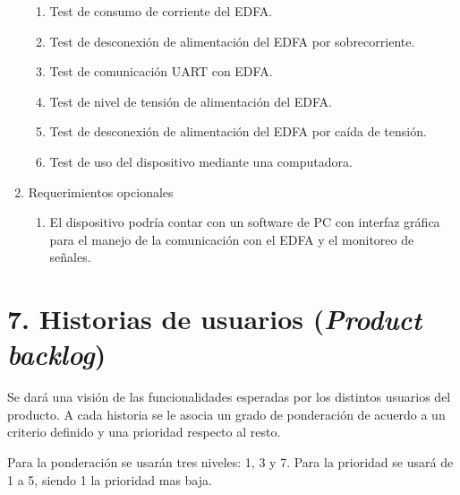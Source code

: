 \documentclass[
11pt, %
codirector, %
]{charter}
\begin{document}
\begin{enumerate}
		\begin{enumerate}
			\item Test de consumo de corriente del EDFA.
			\item Test de desconexión de alimentación del EDFA por sobrecorriente.
			\item Test de comunicación UART con EDFA.
			\item Test de nivel de tensión de alimentación del EDFA.
			\item Test de desconexión de alimentación del EDFA por caída de tensión.
			\item Test de uso del dispositivo mediante una computadora.
		\end{enumerate}
	\item Requerimientos opcionales
		\begin{enumerate}
			\item El dispositivo podría contar con un software de PC con interfaz gráfica para el manejo de la comunicación con el EDFA y el monitoreo de señales.
		\end{enumerate}
\end{enumerate}


\section{7. Historias de usuarios (\textit{Product backlog})}
\label{sec:backlog}

Se dará una visión de las funcionalidades esperadas por los distintos usuarios del producto. A cada
historia se le asocia un grado de ponderación de acuerdo a un criterio definido y una prioridad
respecto al resto.


Para la ponderación se usarán tres niveles: 1, 3 y 7. 
Para la prioridad se usará de 1 a 5, siendo 1 la prioridad mas baja.
\end{document}

